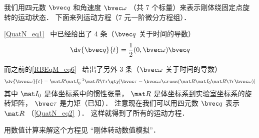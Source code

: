 
\begin{issues}
\issueAbstract
\end{issues}


我们用四元数 $\bvec q$ 和角速度 $\bvec \omega$ （共 7 个标量）来表示刚体绕固定点旋转的运动状态． 下面来列运动方程（7 元一阶微分方程组）．

\autoref{QuatN_eq1}~ 中已经给出了 4 条（$\bvec q$ 关于时间的导数）
\begin{equation}
\dv{\bvec q}{t} = \frac12 (0, \bvec \omega) \bvec q
\end{equation}

而之前的\autoref{RBEqM_eq6}~ 给出了另外 3 条（$\bvec\omega$ 关于时间的导数）
\begin{equation}
\dv{\bvec \omega}{t} = \mat R \mat I_0^{-1} \mat R\Tr \qty[\bvec \tau  - \bvec\omega\cross(\mat R \mat I_0 \mat R\Tr \bvec\omega)]
\end{equation}
其中 $\mat I_0$ 是体坐标系中的惯性张量， $\mat R$ 是体坐标系到实验室坐标系的旋转矩阵， $\bvec\tau$ 是力矩（已知）． 注意现在我们可以用四元数 $\bvec q$ 表示 $\mat R$ （\autoref{QuatN_eq2}~）． 这样就得到了所有的运动方程．

用数值计算来解这个方程见 “刚体转动数值模拟”．
